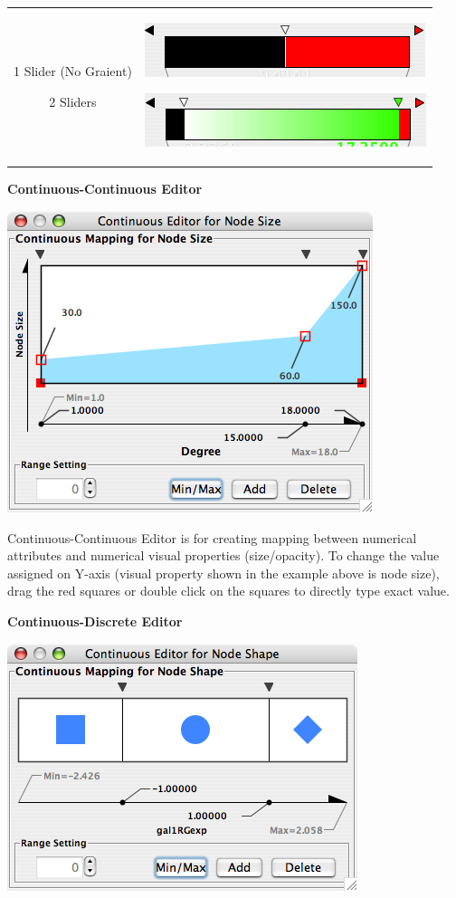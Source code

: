 \begin{tabular}{|c|c|}
\hline 
 & \\
 \hline 


  1 Slider (No Graient) 


  2 Sliders 
 &

 \includegraphics[width=.6\textwidth]{images/OneSlider.png} 


 \includegraphics[width=.6\textwidth]{images/TwoSliders.png} 
 \\
 \hline 

\end{tabular}


 
\textbf{Continuous-Continuous Editor}


 \includegraphics[width=.6\textwidth]{images/C2CEditor26.png} 


 Continuous-Continuous Editor is for creating mapping between numerical attributes and numerical visual properties (size/opacity). To change the value assigned on Y-axis (visual property shown in the example above is node size), drag the red squares or double click on the squares to directly type exact value. 


 
\textbf{Continuous-Discrete Editor}


 \includegraphics[width=.6\textwidth]{images/C2DEditor26.png} 


